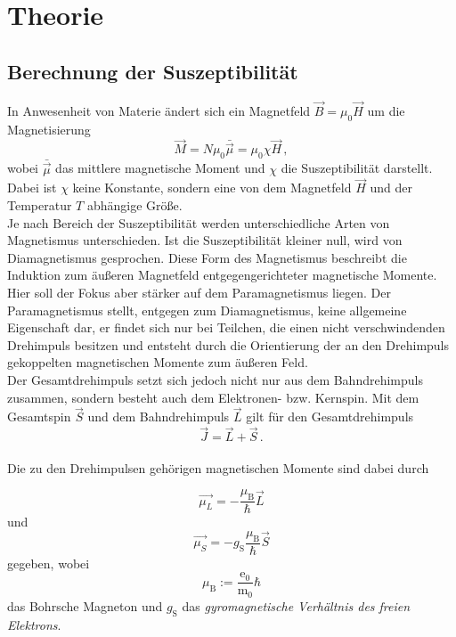 \section{Theorie}
\label{sec:theorie}

\subsection{Berechnung der Suszeptibilität}

In Anwesenheit von Materie ändert sich ein Magnetfeld $\vec{B} = \mu_0 \vec{H}$ um die Magnetisierung
\begin{equation*}
    \vec{M} = N \mu_0 \bar{\vec{\mu}} = \mu_0 \chi \vec{H} \,,
\end{equation*}
wobei $\bar{\vec{\mu}}$ das mittlere magnetische Moment und $\chi$ die Suszeptibilität darstellt.
Dabei ist $\chi$ keine Konstante, sondern eine von dem Magnetfeld $\vec{H}$ und der Temperatur $T$ abhängige Größe. \\

Je nach Bereich der Suszeptibilität werden unterschiedliche Arten von Magnetismus unterschieden.
Ist die Suszeptibilität kleiner null, wird von Diamagnetismus gesprochen.
Diese Form des Magnetismus beschreibt die Induktion zum äußeren Magnetfeld entgegengerichteter magnetische Momente. \\

Hier soll der Fokus aber stärker auf dem Paramagnetismus liegen.
Der Paramagnetismus stellt, entgegen zum Diamagnetismus, keine allgemeine Eigenschaft dar, er findet sich nur bei
Teilchen, die einen nicht verschwindenden Drehimpuls besitzen und entsteht durch die Orientierung der an den
Drehimpuls gekoppelten magnetischen Momente zum äußeren Feld. \\

Der Gesamtdrehimpuls setzt sich jedoch nicht nur aus dem Bahndrehimpuls zusammen, sondern besteht auch dem
Elektronen- bzw. Kernspin.
Mit dem Gesamtspin $\vec{S}$ und dem Bahndrehimpuls $\vec{L}$ gilt für den Gesamtdrehimpuls
\begin{equation}
    \vec{J} = \vec{L} + \vec{S} \,.
\end{equation} \\

Die zu den Drehimpulsen gehörigen magnetischen Momente sind dabei durch

\begin{equation}
    \vec{\mu_L} = -\dfrac{\mu_\text{B}}{\hbar} \vec{L}
    \label{eq:magmomL}
\end{equation}
und
\begin{equation}
    \vec{\mu_S} = - g_\text{S} \dfrac{\mu_\text{B}}{\hbar} \vec{S}
\end{equation}
gegeben, wobei
\begin{equation*}
    \mu_\text{B} := \frac{\text{e}_0}{\text{m}_0} \hbar
\end{equation*}
das Bohrsche Magneton und $g_\text{S}$ das \textit{gyromagnetische Verhältnis des freien Elektrons}. \\

